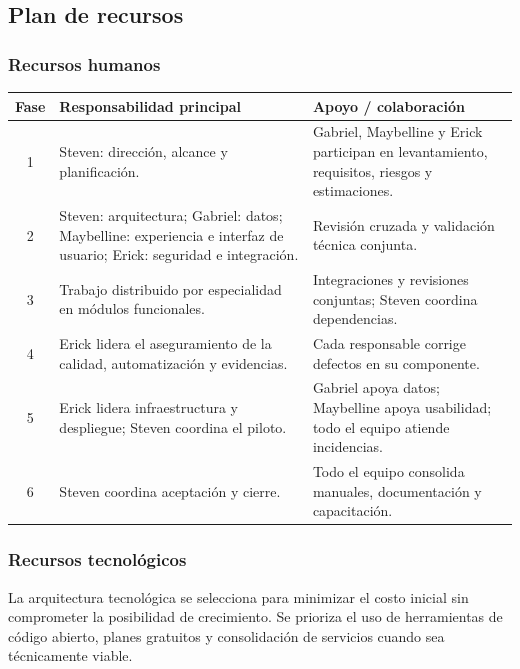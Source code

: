 \documentclass[12pt,a4paper]{article}
\begin{document}
\subsection{Plan de recursos}

\subsubsection{Recursos humanos}

\begin{center}
\renewcommand{\arraystretch}{1.15}
\begin{tabularx}{\textwidth}{|c|X|X|}
\hline
\rowcolor{tableheader}
\textbf{Fase} & \textbf{Responsabilidad principal} & \textbf{Apoyo / colaboración} \\ \hline
1 & Steven: dirección, alcance y planificación. & Gabriel, Maybelline y Erick participan en levantamiento, requisitos, riesgos y estimaciones. \\ \hline
2 & Steven: arquitectura; Gabriel: datos; Maybelline: experiencia e interfaz de usuario; Erick: seguridad e integración. & Revisión cruzada y validación técnica conjunta. \\ \hline
3 & Trabajo distribuido por especialidad en módulos funcionales. & Integraciones y revisiones conjuntas; Steven coordina dependencias. \\ \hline
4 & Erick lidera el aseguramiento de la calidad, automatización y evidencias. & Cada responsable corrige defectos en su componente. \\ \hline
5 & Erick lidera infraestructura y despliegue; Steven coordina el piloto. & Gabriel apoya datos; Maybelline apoya usabilidad; todo el equipo atiende incidencias. \\ \hline
6 & Steven coordina aceptación y cierre. & Todo el equipo consolida manuales, documentación y capacitación. \\ \hline
\end{tabularx}
\end{center}

\subsubsection{Recursos tecnológicos}

La arquitectura tecnológica se selecciona para minimizar el costo inicial sin comprometer la posibilidad de crecimiento. Se prioriza el uso de herramientas de código abierto, planes gratuitos y consolidación de servicios cuando sea técnicamente viable.
\end{document}
